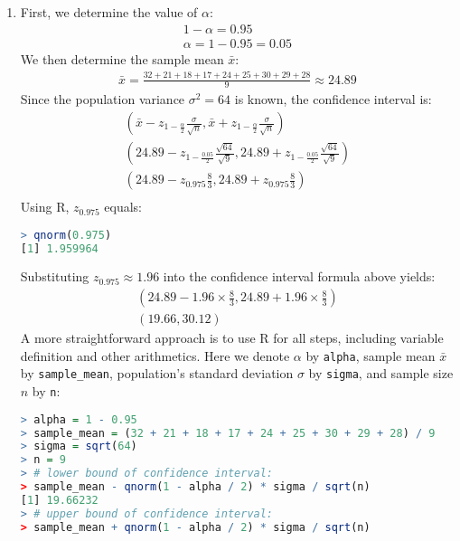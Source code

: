 \begin{solution}
    \begin{enumerate}
    \item 
    First, we determine the value of \( \alpha \):
    \begin{gather*}
        1 - \alpha = 0.95\\
        \alpha = 1 - 0.95 = 0.05
    \end{gather*}
    We then determine the sample mean \( \bar{x} \):
    \begin{gather*}
        \bar{x} = \frac{32 + 21 + 18 + 17 + 24 + 25 + 30 + 29 + 28}{9} \approx 24.89
    \end{gather*}
    Since the population variance \( \sigma^2 = 64 \) is known, the confidence interval is:
    \begin{gather*}
        (\bar{x} - z_{1 - \frac{\alpha}{2}}\frac{\sigma}{\sqrt{n}}, \bar{x} + z_{1 - \frac{\alpha}{2}}\frac{\sigma}{\sqrt{n}})\\
        (24.89 - z_{1 - \frac{0.05}{2}}\frac{\sqrt{64}}{\sqrt{9}}, 24.89 + z_{1 - \frac{0.05}{2}}\frac{\sqrt{64}}{\sqrt{9}})\\
        (24.89 - z_{0.975}\frac{8}{3}, 24.89 + z_{0.975}\frac{8}{3})\\
    \end{gather*}
    Using R, \( z_{0.975} \) equals:
    \begin{lstlisting}[language=R]
> qnorm(0.975)
[1] 1.959964
    \end{lstlisting}
    Substituting \( z_{0.975} \approx 1.96 \) into the confidence interval formula above yields:
    \begin{gather*}
        (24.89 - 1.96 \times \frac{8}{3}, 24.89 + 1.96 \times \frac{8}{3})\\
        (19.66, 30.12)
    \end{gather*}
    A more straightforward approach is to use R for all steps, including variable definition and other arithmetics.
    Here we denote \( \alpha \) by \verb|alpha|,
    sample mean \( \bar{x} \) by \verb|sample_mean|,
    population's standard deviation \( \sigma \) by \verb|sigma|,
    and sample size \( n \) by \verb|n|:
    \begin{lstlisting}[language=R]
> alpha = 1 - 0.95
> sample_mean = (32 + 21 + 18 + 17 + 24 + 25 + 30 + 29 + 28) / 9
> sigma = sqrt(64)
> n = 9
> # lower bound of confidence interval:
> sample_mean - qnorm(1 - alpha / 2) * sigma / sqrt(n)
[1] 19.66232
> # upper bound of confidence interval:
> sample_mean + qnorm(1 - alpha / 2) * sigma / sqrt(n)

\end{lstlisting}
\end{enumerate}
\end{solution}

